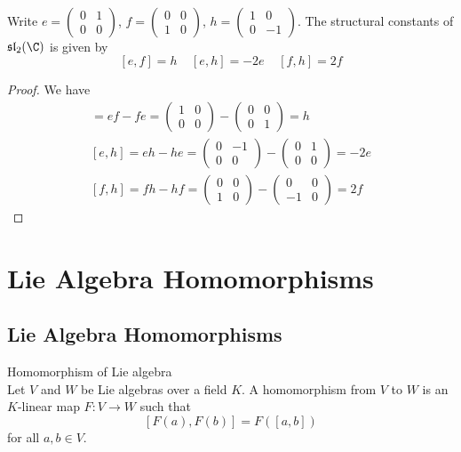 \documentclass[a4paper]{article}
\begin{document}
\begin{eg}{}{} \\Write $e=\begin{pmatrix}
0 & 1\\0 & 0
\end{pmatrix}$, $f=\begin{pmatrix}
0 & 0\\1 & 0
\end{pmatrix}$,  $h=\begin{pmatrix}
1 & 0\\0 & -1
\end{pmatrix}$. The structural constants of $\mathfrak{sl}_2(\C)$ is given by $$[e,f]=h\;\;\;\;[e,h]=-2e\;\;\;\;[f,h]=2f$$

\begin{proof}
We have 
\begin{align*}
[e,f]=ef-fe=\begin{pmatrix}
1 & 0\\0 & 0
\end{pmatrix}-\begin{pmatrix}
0 & 0\\0 & 1
\end{pmatrix}=h\\
[e,h]=eh-he=\begin{pmatrix}
0 & -1\\0 & 0
\end{pmatrix}-\begin{pmatrix}
0 & 1\\0 & 0
\end{pmatrix}=-2e\\
[f,h]=fh-hf=\begin{pmatrix}
0 & 0\\1 & 0
\end{pmatrix}-\begin{pmatrix}
0 & 0\\-1 & 0
\end{pmatrix}=2f
\end{align*}
\end{proof}
\end{eg}

\pagebreak
\section{Lie Algebra Homomorphisms}
\subsection{Lie Algebra Homomorphisms}
\begin{defn}{Homomorphism of Lie algebra}{} \\Let $V$ and $W$ be Lie algebras over a field $K$. A homomorphism from $V$ to $W$ is an $K$-linear map $F:V\to W$ such that $$[F(a),F(b)]=F\left([a,b]\right)$$ for all $a,b\in V$. 
\end{defn}
\end{document}
